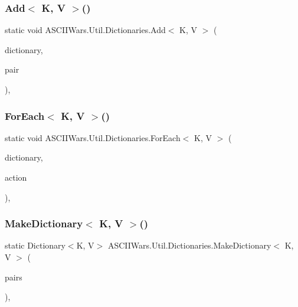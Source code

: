 \subsubsection{\texorpdfstring{Add$<$ K, V $>$()}{Add< K, V >()}}
{\footnotesize\ttfamily static void A\+S\+C\+I\+I\+Wars.\+Util.\+Dictionaries.\+Add$<$ K, V $>$ (\begin{DoxyParamCaption}\item[{this Dictionary$<$ K, V $>$}]{dictionary,  }\item[{Key\+Value\+Pair$<$ K, V $>$}]{pair }\end{DoxyParamCaption})\hspace{0.3cm}{\ttfamily [inline]}, {\ttfamily [static]}}

\hypertarget{class_a_s_c_i_i_wars_1_1_util_1_1_dictionaries_a74c26eb2b4f333fabf83471b63444bcf}{}\label{class_a_s_c_i_i_wars_1_1_util_1_1_dictionaries_a74c26eb2b4f333fabf83471b63444bcf} 
\subsubsection{\texorpdfstring{For\+Each$<$ K, V $>$()}{ForEach< K, V >()}}
{\footnotesize\ttfamily static void A\+S\+C\+I\+I\+Wars.\+Util.\+Dictionaries.\+For\+Each$<$ K, V $>$ (\begin{DoxyParamCaption}\item[{this Dictionary$<$ K, V $>$}]{dictionary,  }\item[{Action$<$ Key\+Value\+Pair$<$ K, V $>$$>$}]{action }\end{DoxyParamCaption})\hspace{0.3cm}{\ttfamily [inline]}, {\ttfamily [static]}}

\hypertarget{class_a_s_c_i_i_wars_1_1_util_1_1_dictionaries_a388efc7bcd0f011123c6d988104a5b29}{}\label{class_a_s_c_i_i_wars_1_1_util_1_1_dictionaries_a388efc7bcd0f011123c6d988104a5b29} 
\subsubsection{\texorpdfstring{Make\+Dictionary$<$ K, V $>$()}{MakeDictionary< K, V >()}}
{\footnotesize\ttfamily static Dictionary$<$K, V$>$ A\+S\+C\+I\+I\+Wars.\+Util.\+Dictionaries.\+Make\+Dictionary$<$ K, V $>$ (\begin{DoxyParamCaption}\item[{params Key\+Value\+Pair$<$ K, V $>$ \mbox{[}$\,$\mbox{]}}]{pairs }\end{DoxyParamCaption})\hspace{0.3cm}{\ttfamily [inline]}, {\ttfamily [static]}}

